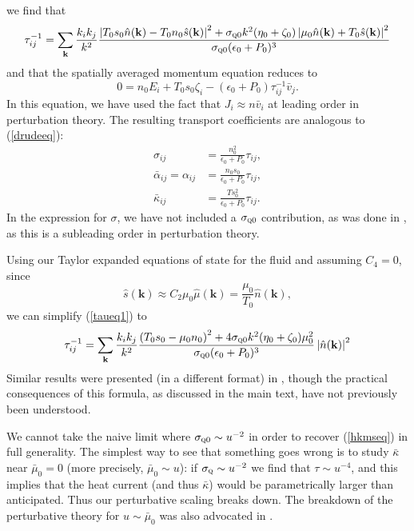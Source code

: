\documentclass[10pt, oneside]{book}
\begin{document}
\begin{doublespace}
\begin{appendix}
we find that \begin{equation}
\tau^{-1}_{ij} = \sum_{\mathbf{k}} \frac{k_ik_j}{k^2} \frac{\left| T_0s_0 \hat n(\mathbf{k}) - T_0n_0 \hat s(\mathbf{k})\right|^2 + \sigma_{\textsc{q}0}k^2 (\eta_0+\zeta_0) \left|\mu_0 \hat n(\mathbf{k}) + T_0\hat s(\mathbf{k})\right|^2}{\sigma_{\textsc{q}0}(\epsilon_0+P_0)^3}   \label{taueq1}
\end{equation}and that the spatially averaged momentum equation reduces to \begin{equation}
0  = n_0  E_i + T_0s_0  \zeta_i -(\epsilon_0+P_0)\tau^{-1}_{ij} \bar v_j .  \label{hydrocpeq}
\end{equation}
In this equation, we have used the fact that $ J_i \approx n \bar v_i$ at leading order in perturbation theory.   The resulting transport coefficients are analogous to (\ref{drudeeq}): \begin{subequations}\begin{align}
\sigma_{ij} &= \frac{n_0^2}{\epsilon_0+P_0}  \tau_{ij}, \\
\bar\alpha_{ij} = \alpha_{ij} &=  \frac{n_0s_0}{\epsilon_0+P_0}\tau_{ij}, \\
\bar\kappa_{ij} &= \frac{Ts_0^2}{\epsilon_0+P_0}\tau_{ij}.
\end{align}\end{subequations}In the expression for $\sigma$, we have not included a $\sigma_{\textsc{q}0}$ contribution, as was done in \cite{hkms}, as this is a subleading order in perturbation theory.

Using our Taylor expanded equations of state for the fluid and assuming $C_4=0$, since \begin{equation}
\hat s(\mathbf{k}) \approx C_2 \mu_0 \hat\mu(\mathbf{k}) = \frac{\mu_0}{T_0}\hat n(\mathbf{k}),
\end{equation}we can simplify (\ref{taueq1}) to \begin{equation}
\tau^{-1}_{ij} = \sum_{\mathbf{k}} \frac{k_ik_j}{k^2} \frac{\left(T_0s_0-\mu_0n_0\right)^2 +4 \sigma_{\textsc{q}0}k^2 (\eta_0+\zeta_0) \mu_0^2 }{\sigma_{\textsc{q}0}(\epsilon_0+P_0)^3}\left|\hat n(\mathbf{k})\right|^2
\end{equation}
Similar results were presented (in a different format) in \cite{Davison:2013txa}, though the practical consequences of this formula, as discussed in the main text, have not previously been understood.


We cannot take the naive limit where $\sigma_{\textsc{q}0}\sim u^{-2}$ in order to recover (\ref{hkmseq}) in full generality.     The simplest way to see that something goes wrong is to study $\bar\kappa$ near $\bar\mu_0=0$ (more precisely, $\bar\mu_0\sim u$):  if $\sigma_{\textsc{q}} \sim u^{-2}$  we find that $\tau \sim u^{-4}$, and this implies that the heat current (and thus $\bar\kappa$) would be parametrically larger than anticipated.   Thus our perturbative scaling breaks down.   The breakdown of the perturbative theory for $u\sim \bar\mu_0$ was also advocated in \cite{Lucas:2015lna}.  
 

\end{appendix}
\end{doublespace}
\end{document}
